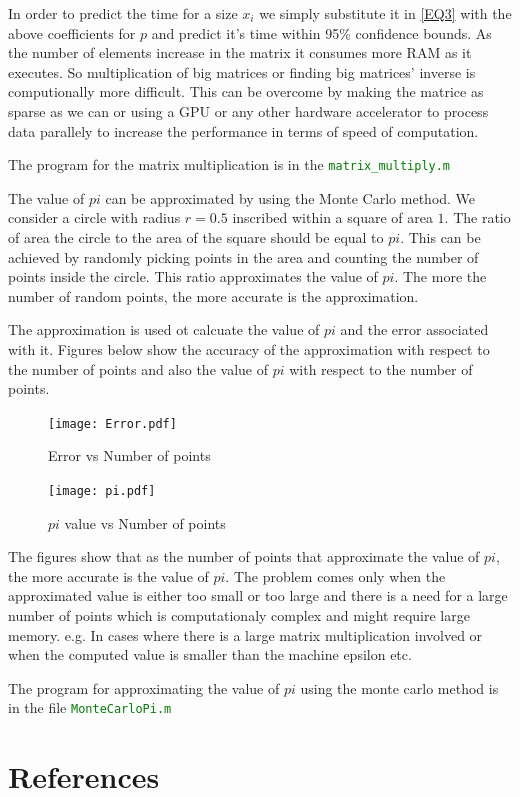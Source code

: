 \documentclass[fleqn,letterpaper,12pt]{report}
\begin{document}
In order to predict the time for a size $x_i$ we simply substitute it in \eqref{EQ3} with the above coefficients for $p$ and predict it's time within 95\% confidence bounds. As the number of elements increase in the matrix it consumes more RAM as it executes. So multiplication of big matrices or finding big matrices' inverse is computionally more difficult. This can be overcome by making the matrice as sparse as we can or using a GPU or any other hardware accelerator to process data parallely to increase the performance in terms of speed of computation. 

The program for the matrix multiplication is in the  {\tt{\textcolor{Green}{matrix\_multiply.m}}}

\addtocounter{problemcounter}{2}


\newpage
{}
{}
\problem 

The value of $pi$ can be approximated by using the Monte Carlo method. We consider a circle with radius $r=0.5$ inscribed within a square of area $1$. The ratio of area the circle to the area of the square should be equal to $pi$. This can be achieved by randomly picking points in the area and counting the number of points inside the circle. This ratio approximates the value of $pi$. The more the number of random points, the more accurate is the approximation.

The approximation is used ot calcuate the value of $pi$ and the error associated with it. Figures below show the accuracy of the approximation with respect to the number of points and also the value of $pi$ with respect to the number of points. 

\begin{figure}[ht!]
	\centering
	\texttt{[image: Error.pdf]}
	\caption{Error vs Number of points \label{overflow}}
\end{figure}

\begin{figure}[ht!]
	\centering
	\texttt{[image: pi.pdf]}
	\caption{$pi$ value vs Number of points\label{overflow}}
\end{figure}
The figures show that as the number of points that approximate the value of $pi$, the more accurate is the value of $pi$. The problem comes only when the approximated value is either too small or too large and there is a need for a large number of points which is computationaly complex and might require large memory. e.g. In cases where there is a large matrix multiplication involved or when the computed value is smaller than the machine epsilon etc.

The program for approximating the value of $pi$ using the monte carlo method is in the file \textcolor{Green}{\tt MonteCarloPi.m}
%
\newpage
{}
{}
\section*{References}


\end{document}
